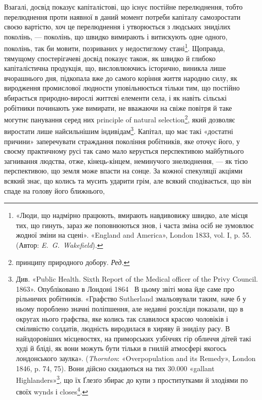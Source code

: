 Взагалі, досвід показує капіталістові, що існує постійне
перелюднення, тобто перелюднення проти наявної в даний момент
потреби капіталу самозростати своєю вартістю, хоч це перелюднення
і утворюється з людських зниділих поколінь, — поколінь,
що швидко вимирають і витискують одне одного, поколінь, так
би мовити, позриваних у недостиглому стані\footnote{
«Люди, що надмірно працюють, вмирають навдивовижу швидко,
але місця тих, що гинуть, зараз же поповнюються знов, і часта зміна
осіб не зумовлює жодної зміни на сцені». «England and America»,
London 1833, vol. I, p. 55. (Автор: \emph{E.~G.~Wakefield}).
}. Щоправда,
тямущому спостерігачеві досвід показує також, як швидко
й глибоко капіталістична продукція, що, висловлюючись історично,
виникла лише вчорашнього дня, підкопала вже до
самого коріння життя народню силу, як виродження промислової
людности уповільнюється тільки тим, що постійно вбирається
природно-вирослі життєві елементи села, і як навіть сільські
робітники починають уже вимирати, не вважаючи на свіже повітря
й таке могутнє панування серед них principle of natural selection\footnote*{
принципу природного добору. \emph{Ред.}
},
який дозволяє виростати лише найсильнішим індивідам\footnote{
Див. «Public Health. Sixth Report of the Medical officer of the
Privy Council. 1863». Опубліковано в Лондоні 1864~ В цьому звіті
мова йде саме про рільничих робітників. «Графство Sutherland змальовували
таким, наче б у ньому пороблено значні поліпшення, але недавні
розсліди показали, що в округах нього графства, яке колись так славилося
красою чоловіків і сміливістю солдатів, людність виродилася в
хиряву й зниділу расу. В найздоровіших місцевостях, на приморських
узбіччях гір обличчя дітей такі худі й бліді, як вони можуть бути
тільки в гнилій атмосфері якогось лондонського заулка». (\emph{Thornton}:
«Overpopulation and its Remedy», London 1846, p. 74, 75). Вони дійсно
скидаються на тих \num{30.000} «gallant Highlanders»\footnote*{
бравих горян. \emph{Ред.}
}, що їх Ґлезґо збирає
до купи з проститутками й злодіями по своїх wynds і closes\footnote*{
заулках і вертепах. \emph{Ред.}
}.
}.
Капітал, що має такі «достатні причини» заперечувати страждання
покоління робітників, яке оточує його, у своєму практичному
русі так само мало керується перспективою майбутнього загнивання
людства, отже, кінець-кінцем, неминучого знелюднення, —
як тією перспективою, що земля може впасти на сонце. За кожної
спекуляції акціями всякий знає, що колись та мусить ударити
грім, але всякий сподівається, що він спаде на голову його ближнього,

